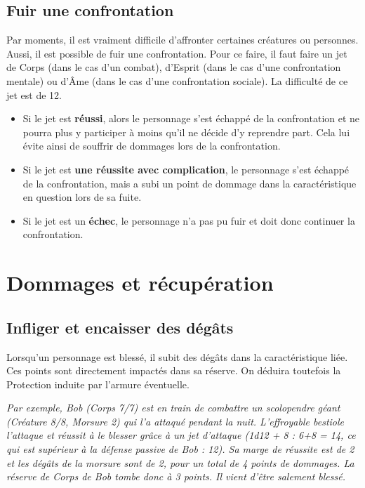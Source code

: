 \documentclass[a4paper,10pt,twoside,twocolumn,openany,bg=print,justified]{dndbook}
\begin{document}
\subsection*{Fuir une confrontation}

Par moments, il est vraiment difficile d'affronter certaines créatures ou personnes. Aussi, il est possible de fuir une confrontation. Pour ce faire, il faut faire un jet de Corps (dans le cas d'un combat), d'Esprit (dans le cas d'une confrontation mentale) ou d'Âme (dans le cas d'une confrontation sociale). La difficulté de ce jet est de 12.

\begin{itemize}
\item Si le jet est \textbf{réussi}, alors le personnage s'est échappé de la confrontation et ne pourra plus y participer à moins qu'il ne décide d'y reprendre part. Cela lui évite ainsi de souffrir de dommages lors de la confrontation.
\item Si le jet est \textbf{une réussite avec complication}, le personnage s'est échappé de la confrontation, mais a subi un point de dommage dans la caractéristique en question lors de sa fuite.
\item Si le jet est un \textbf{échec}, le personnage n'a pas pu fuir et doit donc continuer la confrontation.
\end{itemize}

\section{Dommages et récupération}

\subsection*{Infliger et encaisser des dégâts}

Lorsqu'un personnage est blessé, il subit des dégâts dans la caractéristique liée. Ces points sont directement impactés dans sa réserve. On déduira toutefois la Protection induite par l'armure éventuelle.

\emph{Par exemple, Bob (Corps 7/7) est en train de combattre un scolopendre géant (Créature 8/8, Morsure 2) qui l'a attaqué pendant la nuit. L'effroyable bestiole l'attaque et réussit à le blesser grâce à un jet d'attaque (1d12 + 8 : 6+8 = 14, ce qui est supérieur à la défense passive de Bob : 12). Sa marge de réussite est de 2 et les dégâts de la morsure sont de 2, pour un total de 4 points de dommages. La réserve de Corps de Bob tombe donc à 3 points. Il vient d'être salement blessé.}
\end{document}
